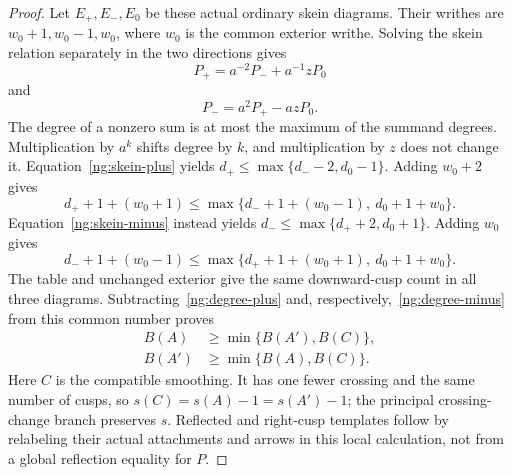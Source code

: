 \begin{proof}
Let $E_+,E_-,E_0$ be these actual ordinary skein diagrams. Their writhes
are $w_0+1,w_0-1,w_0$, where $w_0$ is the common exterior writhe.
Solving the skein relation separately in the two directions gives
\begin{equation}\label{ng:skein-plus}
 P_+=a^{-2}P_-+a^{-1}zP_0
\end{equation}
and
\begin{equation}\label{ng:skein-minus}
 P_-=a^2P_+-azP_0.
\end{equation}
The degree of a nonzero sum is at most the maximum of the summand
degrees. Multiplication by $a^k$ shifts degree by $k$, and multiplication
by $z$ does not change it. Equation~\eqref{ng:skein-plus} yields
$d_+\leq\max\{d_--2,d_0-1\}$. Adding $w_0+2$ gives
\begin{equation}\label{ng:degree-plus}
 d_++1+(w_0+1)
 \leq\max\{d_-+1+(w_0-1),\ d_0+1+w_0\}.
\end{equation}
Equation~\eqref{ng:skein-minus} instead yields
$d_-\leq\max\{d_++2,d_0+1\}$. Adding $w_0$ gives
\begin{equation}\label{ng:degree-minus}
 d_-+1+(w_0-1)
 \leq\max\{d_++1+(w_0+1),\ d_0+1+w_0\}.
\end{equation}
The table and unchanged exterior give the same downward-cusp count
in all three diagrams. Subtracting~\eqref{ng:degree-plus} and,
respectively,~\eqref{ng:degree-minus} from this common number proves
\begin{equation}\label{ng:skein-defect}
 \begin{aligned}
 B(A)&\geq\min\{B(A'),B(C)\},\\
 B(A')&\geq\min\{B(A),B(C)\}.
 \end{aligned}
\end{equation}
Here $C$ is the compatible smoothing. It has one fewer crossing and
the same number of cusps, so $s(C)=s(A)-1=s(A')-1$; the principal
crossing-change branch preserves $s$. Reflected and right-cusp templates
follow by relabeling their actual attachments and arrows in this local
calculation, not from a global reflection equality for $P$.
\end{proof}

